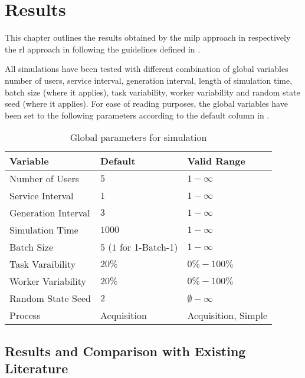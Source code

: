 \chapter{Results}
\label{ch:results}

This chapter outlines the results obtained by the \gls{milp} approach in  respectively the \gls{rl} approach in  following the guidelines defined in .

All simulations have been tested with different combination of global variables \ie number of users, service interval, generation interval, length of simulation time, batch size (where it applies), task variability, worker variability and random state seed (where it applies). For ease of reading purposes, the global variables have been set to the following parameters according to the default column in .

\begin{table}[!ht]
	\centering
		\begin{tabular}{@{}lll@{}}
		\toprule
		Variable            & Default     & Valid Range \\ \midrule
		Number of Users     & $5$           & $1-\infty$      \\
		Service Interval    & $1$           & $1-\infty$      \\
		Generation Interval & $3$           & $1-\infty$      \\
		Simulation Time     & $1000$          & $1-\infty$      \\
		Batch Size          & $5$ ($1$ for 1-Batch-1)           & $1-\infty$      \\
		Task Varaibility    & $20\%$        & $0\%-100\%$      \\
		Worker Variability  & $20\%$        & $0\%-100\%$      \\
		Random State Seed   & $2$           & $\emptyset-\infty$      \\
		Process    & Acquisition & Acquisition, Simple      \\ \bottomrule
		\end{tabular}
	\caption{Global parameters for simulation}
	\label{tab:global_parameters_sim}
\end{table}

\section{ Results and Comparison with Existing Literature}
\label{sec:opt_comparison}

